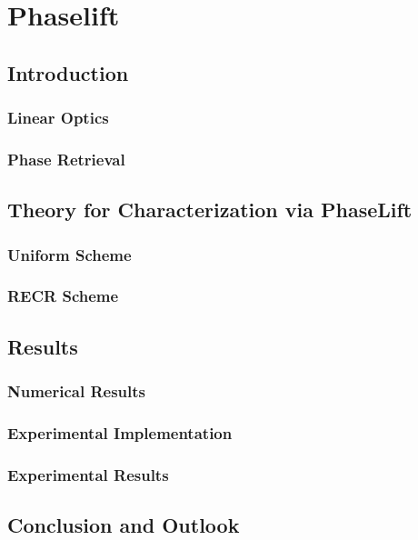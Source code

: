 \chapter{Phaselift}
\label{chap:phaselift}


\section{Introduction}
\subsection{Linear Optics}
\subsection{Phase Retrieval}

\section{Theory for Characterization via PhaseLift}
\subsection{Uniform Scheme}
\subsection{RECR Scheme}

\section{Results}
\subsection{Numerical Results}
\subsection{Experimental Implementation}
\subsection{Experimental Results}

\section{Conclusion and Outlook}
